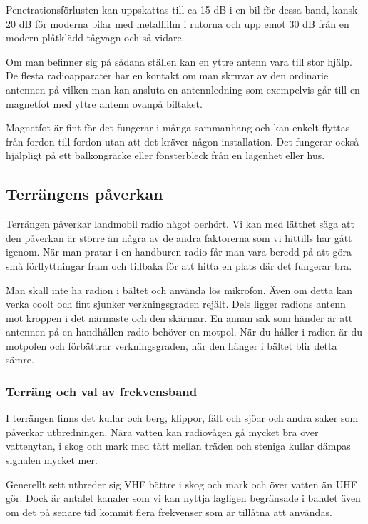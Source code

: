 Penetrationsförlusten kan uppskattas till ca 15 dB i en bil för dessa band, kansk 20 dB för moderna bilar med metallfilm i rutorna och upp emot 30 dB från en modern plåtklädd tågvagn och så vidare.

Om man befinner sig på sådana ställen kan en yttre antenn vara till stor hjälp. De flesta radioapparater har en kontakt om man skruvar av den ordinarie antennen på vilken man kan ansluta en antennledning som exempelvis går till en magnetfot med yttre antenn ovanpå biltaket.

Magnetfot är fint för det fungerar i många sammanhang och kan enkelt flyttas från fordon till fordon utan att det kräver någon installation. Det fungerar också hjälpligt på ett balkongräcke eller fönsterbleck från en lägenhet eller hus.


\subsection{Terrängens påverkan}

Terrängen påverkar landmobil radio något oerhört. Vi kan med lätthet säga att den påverkan är större än några av de andra faktorerna som vi hittills har gått igenom. När man pratar i en handburen radio får man vara beredd på att göra små förflyttningar fram och tillbaka för att hitta en plats där det fungerar bra.

Man skall inte ha radion i bältet och använda lös mikrofon. Även om detta kan verka coolt och fint sjunker verkningsgraden rejält. Dels ligger radions antenn mot kroppen i det närmaste och den skärmar. En annan sak som händer är att antennen på en handhållen radio behöver en motpol. När du håller i radion är du motpolen och förbättrar verkningsgraden, när den hänger i bältet blir detta sämre.

\subsubsection{Terräng och val av frekvensband}

I terrängen finns det kullar och berg, klippor, fält och sjöar och andra saker som påverkar utbredningen. Nära vatten kan radiovågen gå mycket bra över vattenytan, i skog och mark med tätt mellan träden och steniga kullar dämpas signalen mycket mer.

Generellt sett utbreder sig VHF bättre i skog och mark och över vatten än UHF gör. Dock är antalet kanaler som vi kan nyttja lagligen begränsade i bandet även om det på senare tid kommit flera frekvenser som är tillåtna att användas.

